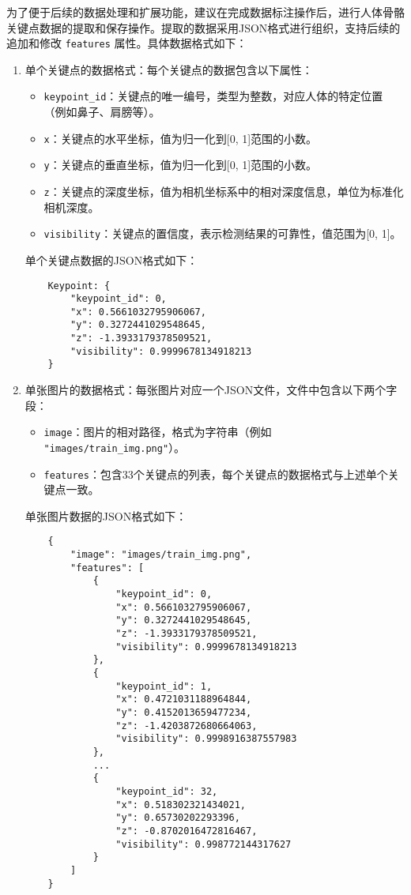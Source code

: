 为了便于后续的数据处理和扩展功能，建议在完成数据标注操作后，进行人体骨骼关键点数据的提取和保存操作。提取的数据采用JSON格式进行组织，支持后续的追加和修改 \texttt{features} 属性。具体数据格式如下：

\begin{enumerate}
    \item 单个关键点的数据格式：每个关键点的数据包含以下属性：
    \begin{itemize}
        \item \texttt{keypoint\_id}：关键点的唯一编号，类型为整数，对应人体的特定位置（例如鼻子、肩膀等）。
        \item \texttt{x}：关键点的水平坐标，值为归一化到[0, 1]范围的小数。
        \item \texttt{y}：关键点的垂直坐标，值为归一化到[0, 1]范围的小数。
        \item \texttt{z}：关键点的深度坐标，值为相机坐标系中的相对深度信息，单位为标准化相机深度。
        \item \texttt{visibility}：关键点的置信度，表示检测结果的可靠性，值范围为[0, 1]。
    \end{itemize}

    单个关键点数据的JSON格式如下：
    \begin{lstlisting}
    Keypoint: {
        "keypoint_id": 0,
        "x": 0.5661032795906067,
        "y": 0.3272441029548645,
        "z": -1.3933179378509521,
        "visibility": 0.9999678134918213
    }
    \end{lstlisting}

    \item 单张图片的数据格式：每张图片对应一个JSON文件，文件中包含以下两个字段：
    \begin{itemize}
        \item \texttt{image}：图片的相对路径，格式为字符串（例如 \texttt{"images/train\_img.png"}）。
        \item \texttt{features}：包含33个关键点的列表，每个关键点的数据格式与上述单个关键点一致。
    \end{itemize}

    单张图片数据的JSON格式如下：
    \begin{lstlisting}
    {
        "image": "images/train_img.png",
        "features": [
            {
                "keypoint_id": 0,
                "x": 0.5661032795906067,
                "y": 0.3272441029548645,
                "z": -1.3933179378509521,
                "visibility": 0.9999678134918213
            },
            {
                "keypoint_id": 1,
                "x": 0.4721031188964844,
                "y": 0.4152013659477234,
                "z": -1.4203872680664063,
                "visibility": 0.9998916387557983
            },
            ...
            {
                "keypoint_id": 32,
                "x": 0.518302321434021,
                "y": 0.65730202293396,
                "z": -0.8702016472816467,
                "visibility": 0.998772144317627
            }
        ]
    }
    \end{lstlisting}
\end{enumerate}

